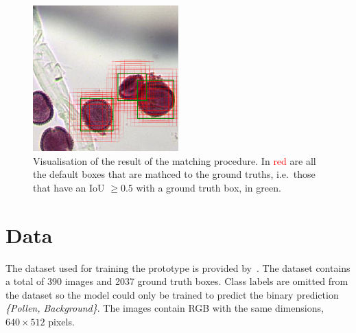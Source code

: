 \begin{figure}[htb]
  \centering
  \includegraphics[width=0.5\textwidth]{figs/priors_matching}
  \caption[Default box mathching]{Visualisation of the result of the matching procedure.
In \textcolor{red}{red} are all the default boxes that are mathced to the ground truths, i.e.~those that have an IoU \( \geq 0.5 \) with a ground truth box, in \textcolor{nicegreen}{green}.}\label{fig:priors}
\end{figure}


\section{Data}
The dataset used for training the prototype is provided by~\cite{gallardo_caballero_precise_2019}.
The dataset contains a total of 390 images and 2037 ground truth boxes.
Class labels are omitted from the dataset so the model could only be trained to predict the binary prediction \textit{\{Pollen, Background\}}.
The images contain RGB with the same dimensions, \( 640\times 512 \) pixels.

